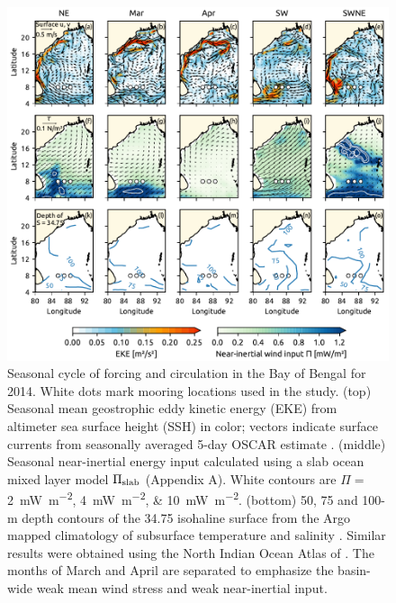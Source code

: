 \documentclass[onecol]{ametsoc}
\begin{document}
\begin{figure}
\centering
\includegraphics[width=\textwidth]{figure2-spatial-maps.pdf}
\caption{\label{fig:spatial}
Seasonal cycle of forcing and circulation in the Bay of Bengal for 2014. White dots mark mooring locations used in the study. (top) Seasonal mean geostrophic eddy kinetic energy (EKE) from altimeter sea surface height (SSH) in color; vectors indicate surface currents from seasonally averaged 5-day OSCAR estimate \citep{oscar,Bonjean2002}. (middle) Seasonal near-inertial energy input calculated using a slab ocean mixed layer model \(\Pi_\text{slab}\) (Appendix A). White contours are \(\Pi=\) \SIlist{2; 4; 10}{\milli\W\per\square\metre}. (bottom) 50, 75 and 100-m depth contours of the 34.75 isohaline surface from the Argo mapped climatology of subsurface temperature and salinity \citep{Roemmich2009}. Similar results were obtained using the North Indian Ocean Atlas of \cite{Chatterjee2012}. The months of March and April are separated to emphasize the basin-wide weak mean wind stress and weak near-inertial input.}
\end{figure}
\end{document}
